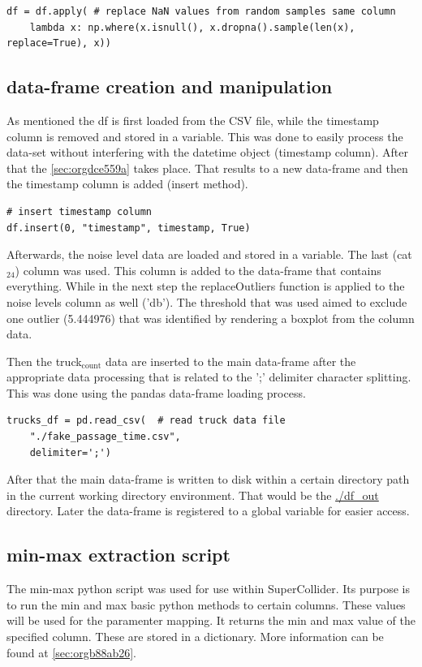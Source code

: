 \documentclass[11pt]{article}
\begin{document}
\begin{verbatim}
df = df.apply( # replace NaN values from random samples same column
    lambda x: np.where(x.isnull(), x.dropna().sample(len(x), replace=True), x))
\end{verbatim}

\subsection{data-frame creation and manipulation}
\label{sec:org8f7763c}
As mentioned the df is first loaded from the CSV file, while the timestamp column is removed and stored in a variable.  This was done to easily process the data-set without interfering with the datetime object (timestamp column).  After that the \ref{sec:orgdce559a} takes place.  That results to a new data-frame and then the timestamp column is added (insert method).
\begin{verbatim}
# insert timestamp column
df.insert(0, "timestamp", timestamp, True)
\end{verbatim}

Afterwards, the noise level data are loaded and stored in a variable.  The last (cat\(_{\text{24}}\)) column was used.  This column is added to the data-frame that contains everything.  While in the next step the replaceOutliers function is applied to the noise levels column as well ('db').  The threshold that was used aimed to exclude one outlier (5.444976) that was identified by rendering a boxplot from the column data.

Then the truck\(_{\text{count}}\) data are inserted to the main data-frame after the appropriate data processing that is related to the ';' delimiter character splitting. This was done using the pandas data-frame loading process.

\begin{verbatim}
trucks_df = pd.read_csv(  # read truck data file
    "./fake_passage_time.csv",
    delimiter=';')
\end{verbatim}

After that the main data-frame is written to disk within a certain directory path in the current working directory environment.  That would be the \url{./df\_out} directory.
Later the data-frame is registered to a global variable for easier access.

\subsection{min-max extraction script}
\label{sec:org7b2bd5e}
The min-max python script was used for use within SuperCollider.  Its purpose is to run the min and max basic python methods to certain columns.  These values will be used for the paramenter mapping.  It returns the min and max value of the specified column.  These are stored in a dictionary.  More information can be found at  \ref{sec:orgb88ab26}.
\end{document}
